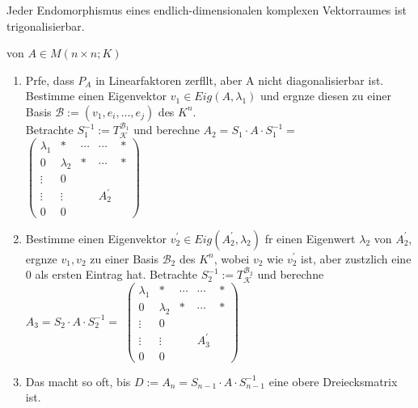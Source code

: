 \documentclass[11pt, a4paper]{article}
\begin{document}
\begin{corollary} Jeder Endomorphismus eines endlich-dimensionalen komplexen Vektorraumes ist trigonalisierbar.
\end{corollary}

\begin{remark}  von $A \in M(n \times n; K)$
\begin{enumerate}
\item Pr\uee fe, dass $P_A$ in Linearfaktoren zerf\aee llt, aber A nicht diagonalisierbar ist. 
\\
Bestimme einen Eigenvektor $v_1 \in Eig(A, \lambda_1 )$ und erg\aee nze diesen zu einer Basis $\mathcal{B} := (v_1, e_i, ..., e_j)$ des $K^n$. 
\\Betrachte $S^{-1}_1 := T^{\mathcal{B}_1}_{\mathcal{K}}$ und berechne $A_2 = S_1 \cdot A \cdot S_1^{-1} = $
$\left(\begin{array}{ccccc}{
\lambda_{1}} & {*} & {\cdots} & {\cdots} & {*} 
\\ {0} & {\lambda_{2}} & {*} & {\cdots} & {*} 
\\ {\vdots} & {0} & {} & {} 
\\ {\vdots} & {\vdots} & {} & {A_{2}^{\prime}} 
\\ {0} & {0} & {} & {} & {}\end{array}\right)$
\item Bestimme einen Eigenvektor $v_2^{\prime} \in Eig(A_{2}^{\prime}, \lambda_2) $ f\uee r einen Eigenwert $\lambda_2$ von $A_{2}^{\prime}$, erg\aee nze $v_1, v_2$ zu einer Basis $\mathcal{B}_2$ des $K^n$, wobei $v_2$ wie  $v_2^{\prime}$ ist, aber zus\aee tzlich eine 0 als ersten Eintrag hat. Betrachte $S^{-1}_2 := T^{\mathcal{B}_2}_{\mathcal{K}}$ und berechne $A_3 = S_2 \cdot A \cdot S_2^{-1} = $
$\left(\begin{array}{ccccc}{
\lambda_{1}} & {*} & {\cdots} & {\cdots} & {*} 
\\ {0} & {\lambda_{2}} & {*} & {\cdots} & {*} 
\\ {\vdots} & {0} & {} & {} 
\\ {\vdots} & {\vdots} & {} & {A_{3}^{\prime}} 
\\ {0} & {0} & {} & {} & {}\end{array}\right)$

\item Das macht so oft, bis $ D := A_n =S_{n-1} \cdot A \cdot S_{n-1}^{-1}$ eine obere Dreiecksmatrix ist.
\end{enumerate}
\end{remark}
\end{document}

